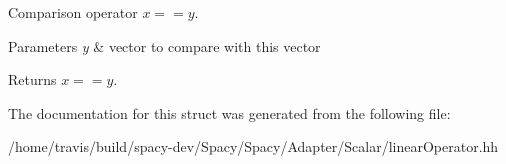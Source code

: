\-Comparison operator $ x==y$. 


\begin{DoxyParams}{\-Parameters}
{\em y} & vector to compare with this vector \\
\hline
\end{DoxyParams}
\begin{DoxyReturn}{\-Returns}
$ x==y$. 
\end{DoxyReturn}


\-The documentation for this struct was generated from the following file\-:\begin{DoxyCompactItemize}
\item 
/home/travis/build/spacy-\/dev/\-Spacy/\-Spacy/\-Adapter/\-Scalar/linear\-Operator.\-hh\end{DoxyCompactItemize}
